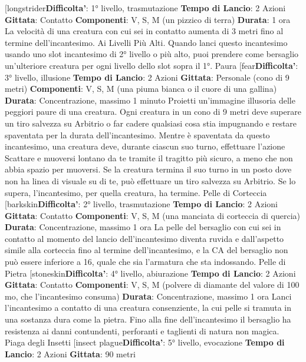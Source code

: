\begin{multicols}{2}
[longstrider\textbf{Difficolta'}:
1° livello, trasmutazione
\textbf{Tempo di Lancio}: 2 Azioni
\textbf{Gittata}: Contatto
\textbf{Componenti}: V, S, M (un pizzico di terra)
\textbf{Durata}: 1 ora
La velocità di una creatura con cui sei in contatto
aumenta di 3 metri fino al termine dell’incantesimo.
Ai Livelli Più Alti. Quando lanci questo incantesimo
usando uno slot incantesimo di 2° livello o più alto, puoi
prendere come bersaglio un’ulteriore creatura per ogni
livello dello slot sopra il 1°.
Paura
[fear\textbf{Difficolta'}:
3° livello, illusione
\textbf{Tempo di Lancio}: 2 Azioni
\textbf{Gittata}: Personale (cono di 9 metri)
\textbf{Componenti}: V, S, M (una piuma bianca o il cuore di
una gallina)
\textbf{Durata}: Concentrazione, massimo 1 minuto
Proietti un’immagine illusoria delle peggiori paure di una
creatura. Ogni creatura in un cono di 9 metri deve
superare un tiro salvezza su Arbitrio o far cadere
qualsiasi cosa stia impugnando e restare spaventata
per la durata dell’incantesimo.
Mentre è spaventata da questo incantesimo, una
creatura deve, durante ciascun suo turno, effettuare
l’azione Scattare e muoversi lontano da te tramite il
tragitto più sicuro, a meno che non abbia spazio per
muoversi. Se la creatura termina il suo turno in un posto
dove non ha linea di visuale su di te, può effettuare un
tiro salvezza su Arbitrio. Se lo supera, l’incantesimo,
per quella creatura, ha termine.
Pelle di Corteccia
[barkskin\textbf{Difficolta'}:
2° livello, trasmutazione
\textbf{Tempo di Lancio}: 2 Azioni
\textbf{Gittata}: Contatto
\textbf{Componenti}: V, S, M (una manciata di corteccia di
quercia)
\textbf{Durata}: Concentrazione, massimo 1 ora
La pelle del bersaglio con cui sei in contatto al
momento del lancio dell’incantesimo diventa ruvida e
dall’aspetto simile alla corteccia fino al termine
dell’incantesimo, e la CA del bersaglio non può essere
inferiore a 16, quale che sia l’armatura che sta
indossando.
Pelle di Pietra
[stoneskin\textbf{Difficolta'}:
4° livello, abiurazione
\textbf{Tempo di Lancio}: 2 Azioni
\textbf{Gittata}: Contatto
\textbf{Componenti}: V, S, M (polvere di diamante del valore di
100 mo, che l’incantesimo consuma)
\textbf{Durata}: Concentrazione, massimo 1 ora
Lanci l’incantesimo a contatto di una creatura
consenziente, la cui pelle si tramuta in una sostanza
dura come la pietra. Fino alla fine dell’incantesimo il
bersaglio ha resistenza ai danni contundenti, perforanti
e taglienti di natura non magica.
Piaga degli Insetti
[insect plague\textbf{Difficolta'}:
5° livello, evocazione
\textbf{Tempo di Lancio}: 2 Azioni
\textbf{Gittata}: 90 metri

\end{multicols}
